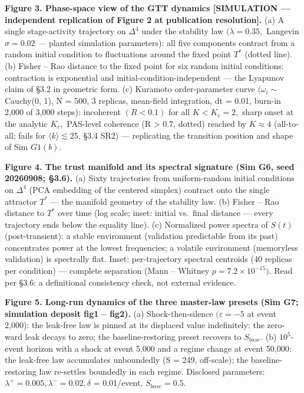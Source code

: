 \documentclass[
]{article}
\begin{document}
\textbf{Figure 3. Phase-space view of the GTT dynamics {[}SIMULATION ---
independent replication of Figure 2 at publication resolution{]}.} (a) A
single stage-activity trajectory on \(\Delta^{4}\) under the stability
law \((\lambda = 0.35,\) Langevin \(\sigma = 0.02\) --- planted
simulation parameters): all five components contract from a random
initial condition to fluctuations around the fixed point \(T^{*}\)
(dotted line). (b) Fisher -- Rao distance to the fixed point for six
random initial conditions: contraction is exponential and
initial-condition-independent --- the Lyapunov claim of §3.2 in
geometric form. (c) Kuramoto order-parameter curve \((\omega_i \sim\)
Cauchy(0, 1), N = 500, 3 replicas, mean-field integration, dt = 0.01,
burn-in 2,000 of 3,000 steps): incoherent \((R < 0.1)\) for all
\(K < K_c = 2,\) sharp onset at the analytic \(K_c,\) PAS-level
coherence (R \textgreater{} 0.7, dotted) reached by \(K \approx 4\)
(all-to-all; fails for \(\langle k\rangle \lesssim 25\), §3.4 SR2) ---
replicating the transition position and shape of Sim \(G1(b).\)

\textbf{Figure 4. The trust manifold and its spectral signature (Sim G6,
seed 20260908; §3.6).} (a) Sixty trajectories from uniform-random
initial conditions on \(\Delta^{4}\) (PCA embedding of the centered
simplex) contract onto the single attractor \(T^{*}\) --- the manifold
geometry of the stability law. (b) Fisher -- Rao distance to \(T^{*}\)
over time (log scale; inset: initial vs.~final distance --- every
trajectory ends below the equality line). (c) Normalized power spectra
of \(S(t)\) (post-transient): a stable environment (validation
predictable from its past) concentrates power at the lowest frequencies;
a volatile environment (memoryless validation) is spectrally flat.
Inset: per-trajectory spectral centroids (40 replicas per condition) ---
complete separation (Mann -- Whitney \(p = 7.2 \times 10^{-15}).\) Read
per §3.6: a definitional consistency check, not external evidence.

\textbf{Figure 5. Long-run dynamics of the three master-law presets (Sim
G7; simulation deposit fig1 -- fig2).} (a) Shock-then-silence
\((\varepsilon = -5\) at event 2,000): the leak-free law is pinned at
its displaced value indefinitely; the zero-ward leak decays to zero; the
baseline-restoring preset recovers to \(S_{base}.\) (b) \(10^{5}\)-event
horizon with a shock at event 5,000 and a regime change at event 50,000:
the leak-free law accumulates unboundedly (S = 249, off-scale); the
baseline-restoring law re-settles boundedly in each regime. Disclosed
parameters: \(\lambda^{+} = 0.005, \lambda^{-} = 0.02, \delta\) =
0.01/event, \(S_{base} = 0.5.\)
\end{document}
